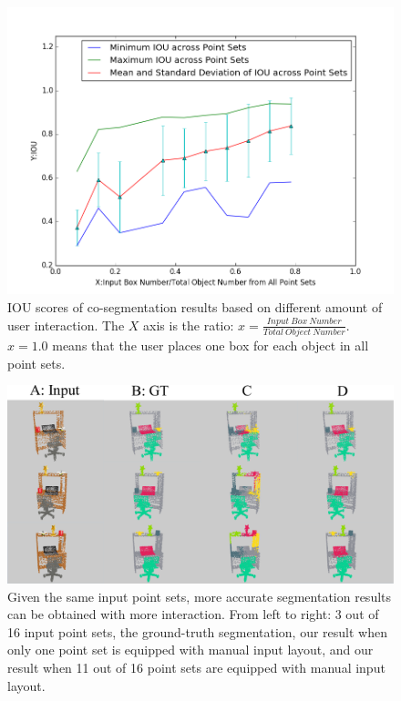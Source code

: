 \begin{figure}
	\centering
	\includegraphics[width=\linewidth]{images/interact/IOU.png}
	\caption{IOU scores of co-segmentation results based on different amount of user interaction. The $X$ axis is the ratio: $x=\frac{Input~Box~Number}{Total~Object~Number}$. $x=1.0$ means that the user places one box for each object in all point sets.}
	\label{fig:interact_number}
\end{figure}

\begin{figure}
	\centering
	\includegraphics[width=\linewidth]{images/interact/interact}
	\caption{Given the same input point sets, more accurate segmentation results can be obtained with more interaction. From left to right: 3 out of 16 input point sets, the ground-truth segmentation, our result when only one point set is equipped with manual input layout, and our result when 11 out of 16 point sets are equipped with manual input layout.
	}
	\label{fig:interact_vis}
\end{figure}

